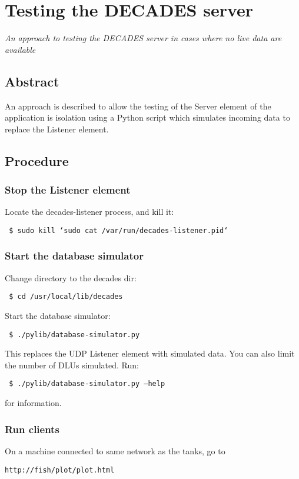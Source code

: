 

\chapter{Testing the DECADES server}
\begin{center}
{\small\em An approach to testing the DECADES server in cases where no live data are available}
\end{center}

\section{Abstract}
An approach is described to allow the testing of the Server element of the application is isolation using a Python script
which simulates incoming data to replace the Listener element.

\section{Procedure}
\subsection{Stop the Listener element} 
Locate the decades-listener process, and kill it: 

\texttt{ \$ sudo kill `sudo cat /var/run/decades-listener.pid`}

\subsection{Start the database simulator}
Change directory to the decades dir:

\texttt{ \$ cd /usr/local/lib/decades}

Start the database simulator:

\texttt{ \$ ./pylib/database-simulator.py }

This replaces the UDP Listener element with simulated data. You can also limit the number of DLUs simulated. Run:

\texttt{ \$ ./pylib/database-simulator.py --help }

for information.

\subsection{Run clients}
On a machine connected to same network as the tanks, go to

\texttt{http://fish/plot/plot.html} 

